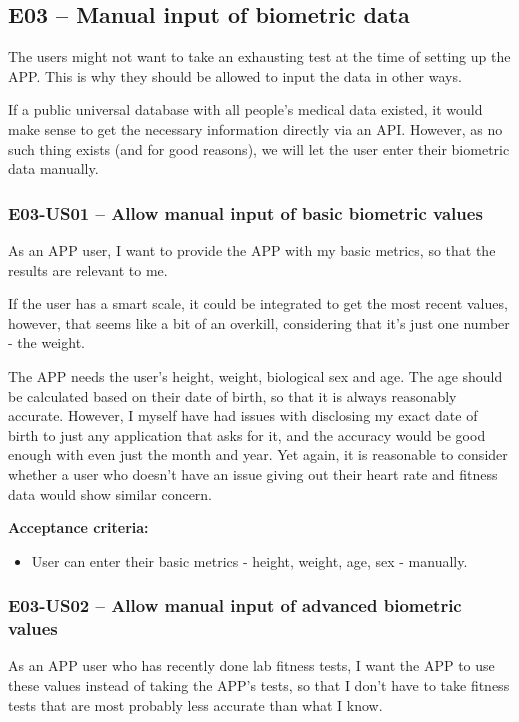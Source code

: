 
\subsection*{E03 -- Manual input of biometric data}
The users might not want to take an exhausting test at the time of setting up the APP.
This is why they should be allowed to input the data in other ways.

If a public universal database with all people's medical data existed, it would make sense to get the necessary information directly via an API.
However, as no such thing exists (and for good reasons), we will let the user enter their biometric data manually.

\subsubsection*{E03-US01 -- Allow manual input of basic biometric values}
As an APP user, I want to provide the APP with my basic metrics, so that the results are relevant to me.

If the user has a smart scale, it could be integrated to get the most recent values, however, that seems like a bit of an overkill, considering that it's just one number - the weight.

The APP needs the user's height, weight, biological sex and age.
The age should be calculated based on their date of birth, so that it is always reasonably accurate.
However, I myself have had issues with disclosing my exact date of birth to just any application that asks for it, and the accuracy would be good enough with even just the month and year.
Yet again, it is reasonable to consider whether a user who doesn't have an issue giving out their heart rate and fitness data would show similar concern.

\textbf{Acceptance criteria:}
\begin{itemize}
    \item User can enter their basic metrics - height, weight, age, sex - manually.
\end{itemize}

\subsubsection*{E03-US02 -- Allow manual input of advanced biometric values}
As an APP user who has recently done lab fitness tests, I want the APP to use these values instead of taking the APP's tests, so that I don't have to take fitness tests that are most probably less accurate than what I know.

